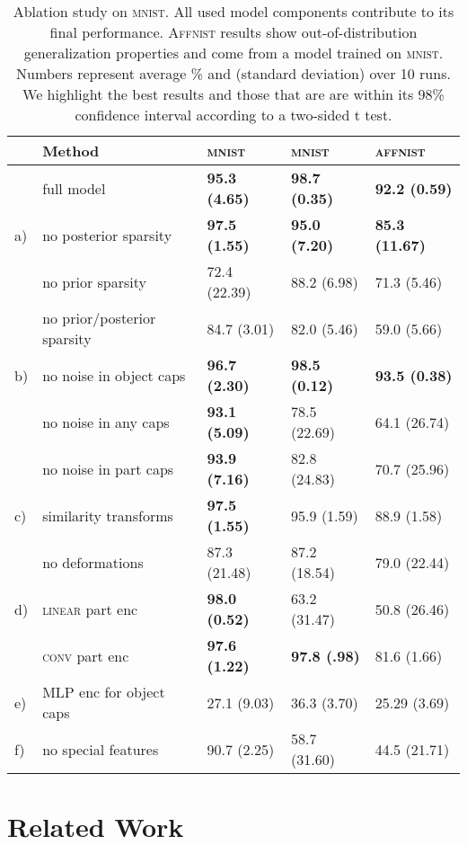 \documentclass{article}
\begin{document}
\begin{table}
	\centering
	\begin{minipage}[c]{.24\linewidth}
		\caption{
			Ablation study on \textsc{mnist}. All used model components contribute to its final performance. \textsc{Affnist} results show out-of-distribution generalization properties and come from a model trained on  \textsc{mnist}. Numbers represent average \% and (standard deviation) over 10 runs. We highlight the best results and those that are are within its 98\% confidence interval according to a two-sided t test.
		}
		\label{tab:ablation}
	\end{minipage}
	\hfill
	\begin{minipage}[c]{.75\linewidth}
		\small
		\begin{tabular}{@{}lllll@{}}
			& Method & \textsc{mnist} &  \textsc{mnist} & \textsc{affnist} \\
			\midrule
			&full model & \textbf{95.3 (4.65)} & \textbf{98.7 (0.35)} & \textbf{92.2 (0.59)} \\
			\midrule
			a)& no posterior sparsity  & \textbf{97.5 (1.55)} & \textbf{95.0    (7.20)} & \textbf{85.3    (11.67)} \\
			& no prior sparsity  & 72.4 (22.39) & 88.2    (6.98) & 71.3    (5.46) \\
			& no prior/posterior sparsity  &    84.7 (3.01) &    82.0 (5.46) & 59.0 (5.66)\\
			\midrule
			b)& no noise in object caps &    \textbf{96.7 (2.30)} &    \textbf{98.5 (0.12)} &    \textbf{93.5 (0.38)}\\
			& no noise in any caps &    \textbf{93.1 (5.09)} &    78.5 (22.69) &    64.1 (26.74)\\
			&no noise in part caps    & \textbf{93.9 (7.16)} &    82.8 (24.83) &    70.7 (25.96)\\
			\midrule
			c)& similarity transforms &    \textbf{97.5 (1.55)} &    95.9 (1.59) &    88.9 (1.58)\\
			&no deformations    & 87.3 (21.48) &    87.2    (18.54) &    79.0    (22.44)\\
			\midrule
			d)&\textsc{linear} part enc & \textbf{98.0 (0.52)} &    63.2 (31.47)    & 50.8 (26.46)\\
			&\textsc{conv} part enc &    \textbf{97.6 (1.22)} &    \textbf{97.8    (.98)} &    81.6    (1.66)\\
			\midrule
			e)& \gls{MLP} enc for object caps    & 27.1 (9.03) &    36.3    (3.70) &    25.29    (3.69)\\
			f)& no special features &    90.7 (2.25) &    58.7 (31.60) &    44.5 (21.71)\\
		\end{tabular}
	\end{minipage}
\end{table} \section{Related Work}
\label{sec:related_work}
\end{document}
